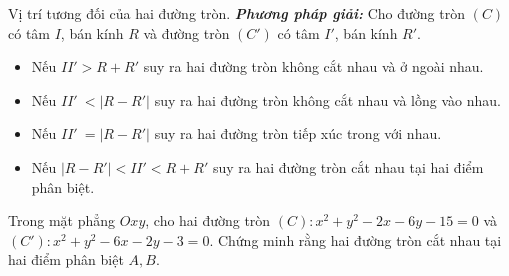 \begin{dang}{Vị trí tương đối của hai đường tròn.}
	\textbf{\textit{Phương pháp giải:}}
	Cho đường tròn $(C)$ có tâm $I$, bán kính $R$ và đường tròn $\left(C'\right)$ có tâm $I'$, bán kính $R'$.
	\begin{itemize}
		\item  Nếu $II' > R+R'$ suy ra hai đường tròn không cắt nhau và ở ngoài nhau. 
		\item Nếu $II'~ < \left| R-R'\right|$ suy ra hai đường tròn không cắt nhau và lồng vào nhau.
		\item Nếu $II'~=\left| R-R'\right|$ suy ra hai đường tròn tiếp xúc trong với nhau.
		\item Nếu $\left| R-R'\right| < II' < R+R'$ suy ra hai đường tròn cắt nhau tại hai điểm phân biệt.
	\end{itemize}
\end{dang}
\begin{vd}
	Trong mặt phẳng $Oxy$, cho hai đường tròn $(C):x^2+y^2-2x-6y-15=0$ và $\left(C'\right):x^2+y^2-6x-2y-3=0$. Chứng minh rằng hai đường tròn cắt nhau tại hai điểm phân biệt $A, B$.
\end{vd}
